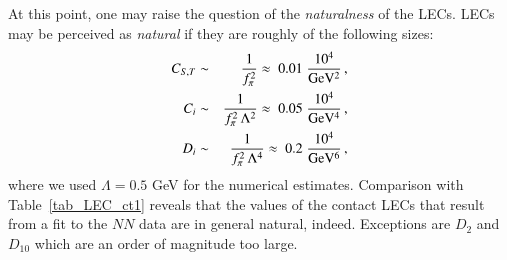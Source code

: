 \documentclass[sort&compress,preprint,3p]{elsarticle}
\begin{document}
At this point, one may raise the question of the {\it naturalness} of the LECs.
LECs may be perceived as {\it natural} if they are roughly of the following sizes:
\begin{eqnarray}
C_{S,T} & \sim & \frac{1}{f_\pi^2} \approx \; 0.01 \; \frac{10^4}{\rm GeV^2} \,,
\label{eq_CST} \\
C_i & \sim & \frac{1}{f_\pi^2 \, \Lambda^2} \approx \; 0.05 \; \frac{10^4}{\rm GeV^4} \,, \\
D_i & \sim & \frac{1}{f_\pi^2 \, \Lambda^4} \approx \; 0.2 \; \frac{10^4}{\rm GeV^6} \,, 
\end{eqnarray}
where  we used $\Lambda=0.5$ GeV for the numerical estimates.
Comparison with Table~\ref{tab_LEC_ct1} reveals that the values of the contact
LECs that result from a fit to the $NN$ data are in general natural, indeed.
Exceptions are $D_2$ and $D_{10}$ which are an order
of magnitude too large. 
\end{document}
